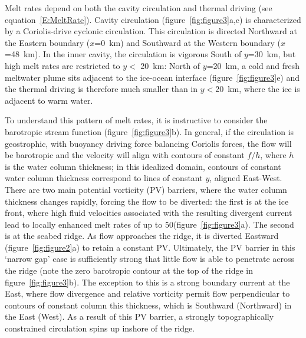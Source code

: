 \documentclass[draft]{agujournal2019}
\begin{document}
Melt rates depend on both the cavity circulation and thermal driving (see equation~\eqref{E:MeltRate}). Cavity circulation (figure~\ref{fig:figure3}a,c) is characterized by a Coriolis-drive cyclonic circulation. This circulation is directed Northward at the Eastern boundary ($x$=0~km) and Southward at the Western boundary ($x$=48~km). In the inner cavity, the circulation is vigorous South of $y$=30~km, but high melt rates are restricted to $y<$ 20~km: North of $y$=20~km, a cold and fresh meltwater plume sits adjacent to the ice-ocean interface (figure~\ref{fig:figure3}e) and the thermal driving is therefore much smaller than in $y<$20~km, where the ice is adjacent to warm water.


To understand this pattern of melt rates, it is instructive to consider the barotropic stream function (figure~\ref{fig:figure3}b). In general, if the circulation is geostrophic, with buoyancy driving force balancing Coriolis forces, the flow will be barotropic and the velocity will align with contours of constant $f/h$, where $h$ is the water column thickness; in this idealized domain, contours of constant water column thickness correspond to lines of constant $y$, aligned East-West. There are two main potential vorticity (PV) barriers, where the water column thickness changes rapidly, forcing the flow to be diverted: the first is at the ice front, where high fluid velocities associated with the resulting divergent current lead to locally enhanced melt rates of up to 50\mpryr (figure~\ref{fig:figure3}a). The second is at the seabed ridge. As flow approaches the ridge, it is diverted Eastward (figure~\ref{fig:figure2}a) to retain a constant PV. Ultimately, the PV barrier in this `narrow gap' case is sufficiently strong that little flow is able to penetrate across the ridge (note the zero barotropic contour at the top of the ridge in figure~\ref{fig:figure3}b). The exception to this is a strong boundary current at the East, where flow divergence and relative vorticity permit flow perpendicular to contours of constant column this thickness, which is Southward (Northward) in the East (West). As a result of this PV barrier, a strongly topographically constrained circulation spins up inshore of the ridge. %
\end{document}
